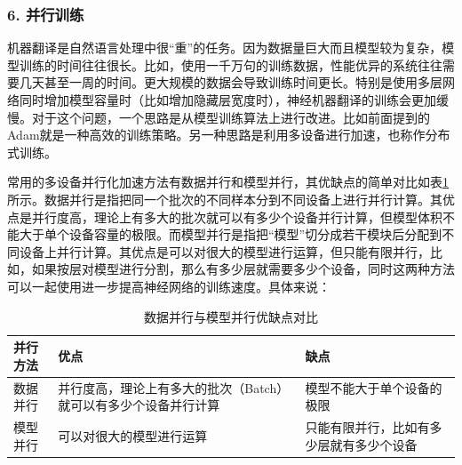 \subsubsection{6. 并行训练}

\parinterval 机器翻译是自然语言处理中很“重”的任务。因为数据量巨大而且模型较为复杂，模型训练的时间往往很长。比如，使用一千万句的训练数据，性能优异的系统往往需要几天甚至一周的时间。更大规模的数据会导致训练时间更长。特别是使用多层网络同时增加模型容量时（比如增加隐藏层宽度时），神经机器翻译的训练会更加缓慢。对于这个问题，一个思路是从模型训练算法上进行改进。比如前面提到的Adam就是一种高效的训练策略。另一种思路是利用多设备进行加速，也称作分布式训练。

\parinterval 常用的多设备并行化加速方法有数据并行和模型并行，其优缺点的简单对比如表\ref{tab:10-9}所示。数据并行是指把同一个批次的不同样本分到不同设备上进行并行计算。其优点是并行度高，理论上有多大的批次就可以有多少个设备并行计算，但模型体积不能大于单个设备容量的极限。而模型并行是指把“模型”切分成若干模块后分配到不同设备上并行计算。其优点是可以对很大的模型进行运算，但只能有限并行，比如，如果按层对模型进行分割，那么有多少层就需要多少个设备，同时这两种方法可以一起使用进一步提高神经网络的训练速度。具体来说：

\begin{table}[htp]
\centering
\caption{ 数据并行与模型并行优缺点对比}
\label{tab:10-9}
\begin{tabular}{l | p{12em}  p{12em} }
并行方法 &优点		&缺点 \\ \hline
\rule{0pt}{15pt}	数据并行 &并行度高，理论上有多大的批次（Batch）就可以有多少个设备并行计算	&模型不能大于单个设备的极限 \\
\rule{0pt}{15pt}	模型并行	&可以对很大的模型进行运算	&只能有限并行，比如有多少层就有多少个设备 \\
\end{tabular}
\end{table}


